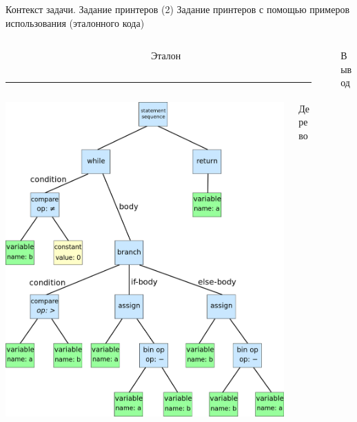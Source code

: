 \documentclass[sans]{beamer}
\begin{document}
\begin{frame}{Контекст задачи. Задание принтеров (2)}
  Задание принтеров с помощью примеров использования (эталонного кода)

  \begin{columns}
    \begin{column}{0.4\linewidth}
      \begin{columns}
        \begin{column}{0.6\linewidth}
          \scriptsize
          \inputminted{java}{codes/whileEx.java}
        \end{column}
        \begin{column}{0.4\linewidth}
          Эталон
        \end{column}
      \end{columns}
      \hrule
      \vspace{1mm}
      \begin{columns}
        \begin{column}{0.6\linewidth}
          \includegraphics[width = \linewidth]{../semiPres/images/ast.png}
        \end{column}
        \begin{column}{0.4\linewidth}
          Дерево
        \end{column}
      \end{columns}
 
    \end{column}
    \begin{column}{0.25\linewidth}
      \scriptsize
      \inputminted{java}{codes/whileRes.java}
    \end{column}
    \begin{column}{0.1\linewidth}
      Вывод
    \end{column}
  \end{columns}
\end{frame}
\end{document}
